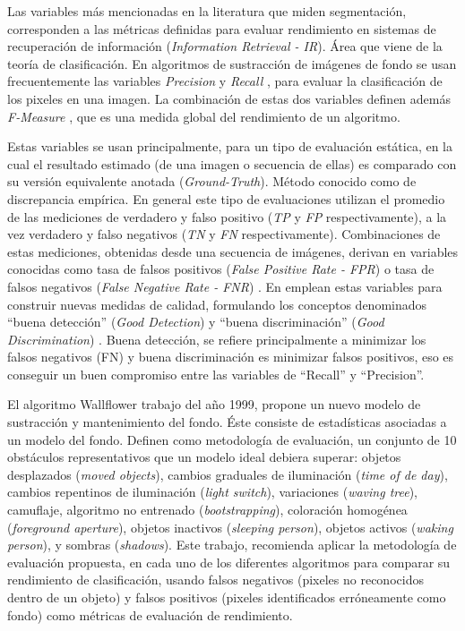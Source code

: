 \indent Las variables más mencionadas en la literatura que miden segmentación, corresponden a las métricas definidas para evaluar rendimiento en sistemas de recuperación de información (\textit{Information Retrieval - IR}). Área que viene de la teoría de clasificación. En algoritmos de sustracción de imágenes de fondo se usan frecuentemente las variables \textit{Precision} y \textit{Recall} \cite{prati_detecting_2003, benezeth_review_2008}, para evaluar la clasificación de los pixeles en una imagen. La combinación de estas dos variables definen además \textit{F-Measure} \cite{herrero_background_2009}, que es una medida global del rendimiento de un algoritmo.

\indent Estas variables se usan principalmente, para un tipo de evaluación estática, en la cual el resultado estimado (de una imagen o secuencia de ellas) es comparado con su versión equivalente anotada (\textit{Ground-Truth}). Método conocido como de discrepancia empírica. En general este tipo de evaluaciones utilizan el promedio de las mediciones de verdadero y falso positivo (\textit{TP} y \textit{FP} respectivamente), a la vez verdadero y falso negativos (\textit{TN} y \textit{FN} respectivamente). Combinaciones de estas mediciones, obtenidas desde una secuencia de imágenes, derivan en variables conocidas como tasa de falsos positivos (\textit{False Positive Rate - FPR}) o tasa de falsos negativos (\textit{False Negative Rate - FNR}) \cite{liu_metrics_2011}. En \cite{prati_detecting_2003} emplean estas variables para construir nuevas medidas de calidad, formulando los conceptos denominados ``buena detección'' (\textit{Good Detection}) y ``buena discriminación'' (\textit{Good Discrimination}) \cite{prati_detecting_2003}. Buena detección, se refiere principalmente a minimizar los falsos negativos (FN) y buena discriminación es minimizar falsos positivos, eso es conseguir un buen compromiso entre las variables de ``Recall'' y ``Precision''.

\indent El algoritmo Wallflower\cite{toyama_wallflower_1999} trabajo del año 1999, propone un nuevo modelo de sustracción y mantenimiento del fondo. Éste consiste de estadísticas asociadas a un modelo del fondo. Definen como metodología de evaluación, un conjunto de 10 obstáculos representativos que un modelo ideal debiera superar: objetos desplazados (\textit{moved objects}), cambios graduales de iluminación (\textit{time of de day}), cambios repentinos de iluminación (\textit{light switch}), variaciones (\textit{waving tree}), camuflaje, algoritmo no entrenado (\textit{bootstrapping}), coloración homogénea (\textit{foreground aperture}), objetos inactivos (\textit{sleeping person}), objetos activos (\textit{waking person}), y sombras (\textit{shadows}). Este trabajo, recomienda aplicar la metodología de evaluación propuesta, en cada uno de los diferentes algoritmos para comparar su rendimiento de clasificación, usando falsos negativos (pixeles no reconocidos dentro de un objeto) y falsos positivos (pixeles identificados erróneamente como fondo) como métricas de evaluación de rendimiento.

